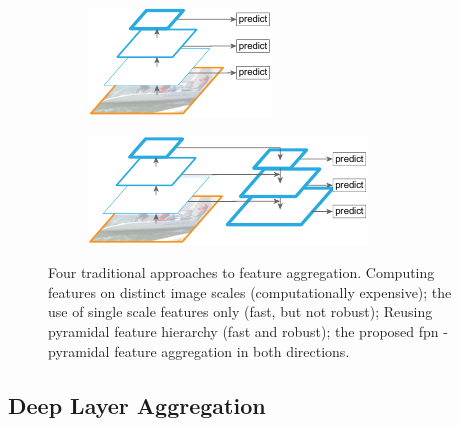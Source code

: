 \begin{figure}
    \begin{subfigure}[t]{0.3\textwidth}
        \centering
        \includegraphics[width=\textwidth]{figures/theoretical_foundations/fpn_pyramidal_feature_hierarchy.pdf}
        \caption[]{}
    \end{subfigure}
    \begin{subfigure}[t]{0.3\textwidth}
        \centering
        \includegraphics[width=\textwidth]{figures/theoretical_foundations/fpn_feature_pyramid_network.pdf}
        \caption[]{}
    \end{subfigure}
    \caption[\gls{fpn}]{Four traditional approaches to feature aggregation.  Computing features on distinct image scales (computationally expensive);  the use of single scale features only (fast, but not robust);  Reusing pyramidal feature hierarchy (fast and robust);  the proposed \gls{fpn} - pyramidal feature aggregation in both directions. }
    \label{fig:FPNVariousApproaches}
\end{figure}

\subsection{Deep Layer Aggregation}
\label{ssec:DeepLayerAggregation}

